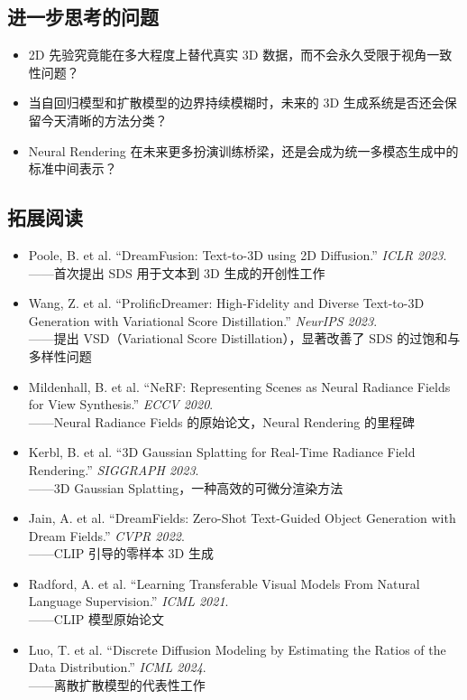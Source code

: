\subsection{进一步思考的问题}

\begin{itemize}
    \item 2D 先验究竟能在多大程度上替代真实 3D 数据，而不会永久受限于视角一致性问题？
    \item 当自回归模型和扩散模型的边界持续模糊时，未来的 3D 生成系统是否还会保留今天清晰的方法分类？
    \item Neural Rendering 在未来更多扮演训练桥梁，还是会成为统一多模态生成中的标准中间表示？
\end{itemize}

\subsection{拓展阅读}

\begin{itemize}
    \item Poole, B. et al. ``DreamFusion: Text-to-3D using 2D Diffusion.'' \textit{ICLR 2023}. \\
    ——首次提出 SDS 用于文本到 3D 生成的开创性工作

    \item Wang, Z. et al. ``ProlificDreamer: High-Fidelity and Diverse Text-to-3D Generation with Variational Score Distillation.'' \textit{NeurIPS 2023}. \\
    ——提出 VSD（Variational Score Distillation），显著改善了 SDS 的过饱和与多样性问题

    \item Mildenhall, B. et al. ``NeRF: Representing Scenes as Neural Radiance Fields for View Synthesis.'' \textit{ECCV 2020}. \\
    ——Neural Radiance Fields 的原始论文，Neural Rendering 的里程碑

    \item Kerbl, B. et al. ``3D Gaussian Splatting for Real-Time Radiance Field Rendering.'' \textit{SIGGRAPH 2023}. \\
    ——3D Gaussian Splatting，一种高效的可微分渲染方法

    \item Jain, A. et al. ``DreamFields: Zero-Shot Text-Guided Object Generation with Dream Fields.'' \textit{CVPR 2022}. \\
    ——CLIP 引导的零样本 3D 生成

    \item Radford, A. et al. ``Learning Transferable Visual Models From Natural Language Supervision.'' \textit{ICML 2021}. \\
    ——CLIP 模型原始论文

    \item Luo, T. et al. ``Discrete Diffusion Modeling by Estimating the Ratios of the Data Distribution.'' \textit{ICML 2024}. \\
    ——离散扩散模型的代表性工作
\end{itemize}



